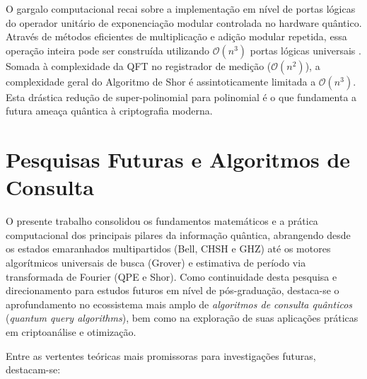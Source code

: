 \documentclass[12pt, a4paper]{article}
\begin{document}
O gargalo computacional recai sobre a implementação em nível de portas lógicas do operador unitário de exponenciação modular controlada no hardware quântico. Através de métodos eficientes de multiplicação e adição modular repetida, essa operação inteira pode ser construída utilizando $\mathcal{O}(n^3)$ portas lógicas universais \cite{nielsen2010}. Somada à complexidade da QFT no registrador de medição ($\mathcal{O}(n^2)$), a complexidade geral do Algoritmo de Shor é assintoticamente limitada a $\mathcal{O}(n^3)$. Esta drástica redução de super-polinomial para polinomial é o que fundamenta a futura ameaça quântica à criptografia moderna.

\section{Pesquisas Futuras e Algoritmos de Consulta}

O presente trabalho consolidou os fundamentos matemáticos e a prática computacional dos principais pilares da informação quântica, abrangendo desde os estados emaranhados multipartidos (Bell, CHSH e GHZ) até os motores algorítmicos universais de busca (Grover) e estimativa de período via transformada de Fourier (QPE e Shor). Como continuidade desta pesquisa e direcionamento para estudos futuros em nível de pós-graduação, destaca-se o aprofundamento no ecossistema mais amplo de \textit{algoritmos de consulta quânticos} (\textit{quantum query algorithms}), bem como na exploração de suas aplicações práticas em criptoanálise e otimização.

Entre as vertentes teóricas mais promissoras para investigações futuras, destacam-se:
\end{document}
